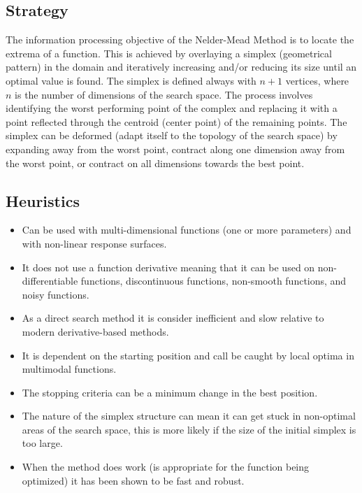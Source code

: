 \subsection{Strategy}
The information processing objective of the Nelder-Mead Method is to locate the extrema of a function.
This is achieved by overlaying a simplex (geometrical pattern) in the domain and iteratively increasing and/or reducing its size until an optimal value is found. The simplex is defined always with $n+1$ vertices, where $n$ is the number of dimensions of the search space. The process involves identifying the worst performing point of the complex and replacing it with a point reflected through the centroid (center point) of the remaining points. The simplex can be deformed (adapt itself to the topology of the search space) by expanding away from the worst point, contract along one dimension away from the worst point, or contract on all dimensions towards the best point.

\subsection{Heuristics}

\begin{itemize}
	\item Can be used with multi-dimensional functions (one or more parameters) and with non-linear response surfaces.
	\item It does not use a function derivative meaning that it can be used on non-differentiable functions, discontinuous functions, non-smooth functions, and noisy functions.
	\item As a direct search method it is consider inefficient and slow relative to modern derivative-based methods.
	\item It is dependent on the starting position and call be caught by local optima in multimodal functions.
	\item The stopping criteria can be a minimum change in the best position. 
	\item The nature of the simplex structure can mean it can get stuck in non-optimal areas of the search space, this is more likely if the size of the initial simplex is too large.
	\item When the method does work (is appropriate for the function being optimized) it has been shown to be fast and robust.
\end{itemize}

